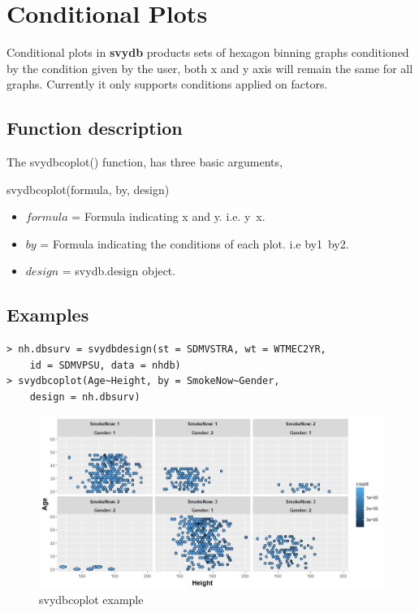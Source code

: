 \newpage
\section{Conditional Plots} \label{c3.4}
Conditional plots in {\bf svydb} products sets of hexagon binning graphs conditioned by the condition given by the user, both x and y axis will remain the same for all graphs. Currently it only supports conditions applied on factors.

\subsection{Function description} \label{c.3.1.1}
The {\ttfamily svydbcoplot()} function, has three basic arguments,
\begin{center}
    {\ttfamily svydbcoplot(formula, by, design)}
\end{center}

\begin{itemize}
\item $formula$ = Formula indicating x and y. i.e. y~x.

\item $by$ = Formula indicating the conditions of each plot. i.e by1~by2.

\item $design$ = svydb.design object.
\end{itemize}

\subsection{Examples} \label{c.3.1.2}
\begin{lstlisting}
> nh.dbsurv = svydbdesign(st = SDMVSTRA, wt = WTMEC2YR, 
    id = SDMVPSU, data = nhdb)
> svydbcoplot(Age~Height, by = SmokeNow~Gender, 
    design = nh.dbsurv)
\end{lstlisting}

\begin{figure}[h]
    \centering
    \includegraphics[scale = 0.55]{img/coplot-e.jpeg}
    \caption{{\ttfamily svydbcoplot} example}
    \label{fig:coplot-e}
\end{figure}


